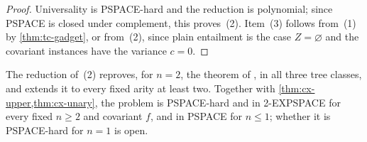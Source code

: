 \begin{proof}
Universality is PSPACE-hard and the reduction is polynomial; since PSPACE is
closed under complement, this proves~(2). Item~(3) follows from~(1) by
\cref{thm:tc-gadget}, or from~(2), since plain entailment is the case
$Z=\varnothing$ and the covariant instances have the variance $c=0$.
\end{proof}

The reduction of~(2) reproves, for $n=2$, the theorem of
\citet{HengleinRehof98}, in all three tree classes, and extends it to every
fixed arity at least two. Together with \cref{thm:cx-upper,thm:cx-unary}, the
problem is PSPACE-hard and in 2-EXPSPACE for every fixed $n\ge2$ and covariant
$f$, and in PSPACE for $n\le1$; whether it is PSPACE-hard for $n=1$ is open.
